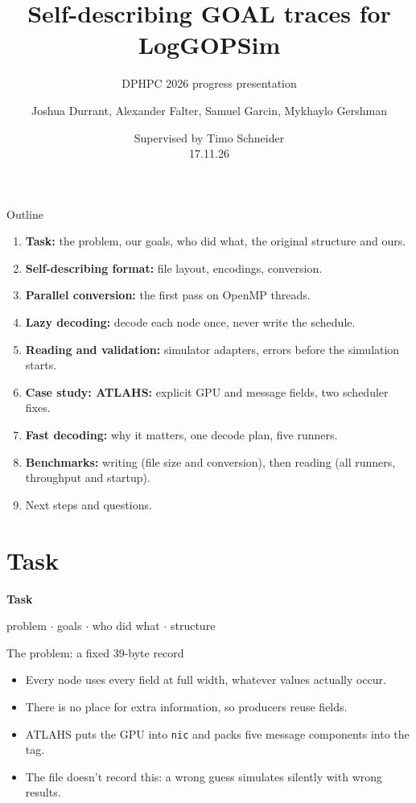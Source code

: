 \documentclass[aspectratio=169,11pt]{beamer}
\title{Self-describing GOAL traces for LogGOPSim}
\subtitle{DPHPC 2026 progress presentation}
\author{Joshua Durrant, Alexander Falter, Samuel Garcin, Mykhaylo Gershman}
\date{Supervised by Timo Schneider \\ 17.11.26}
\newcommand{\diagram}[1]{\resizebox{\linewidth}{!}{}}
\begin{document}
\begin{frame}
\titlepage
\end{frame}

\begin{frame}{Outline}
\begin{enumerate}
\item \textbf{Task:} the problem, our goals, who did what, the original structure and ours.
\item \textbf{Self-describing format:} file layout, encodings, conversion.
\item \textbf{Parallel conversion:} the first pass on OpenMP threads.
\item \textbf{Lazy decoding:} decode each node once, never write the schedule.
\item \textbf{Reading and validation:} simulator adapters, errors before the simulation starts.
\item \textbf{Case study: ATLAHS:} explicit GPU and message fields, two scheduler fixes.
\item \textbf{Fast decoding:} why it matters, one decode plan, five runners.
\item \textbf{Benchmarks:} writing (file size and conversion), then reading (all runners, throughput and startup).
\item Next steps and questions.
\end{enumerate}
\end{frame}

\section{Task}

\begin{frame}
\centering\vfill
{\Huge\bfseries Task\par}
\vspace{3mm}
{\small\color{black!60}problem $\cdot$ goals $\cdot$ who did what $\cdot$ structure\par}
\vfill
\end{frame}

\begin{frame}{The problem: a fixed 39-byte record}
\diagram{legacy-record}
\vspace{2mm}
\begin{itemize}
\item Every node uses every field at full width, whatever values actually occur.
\item There is no place for extra information, so producers reuse fields.
\item ATLAHS puts the GPU into \texttt{nic} and packs five message components into the tag.
\item The file doesn't record this: a wrong guess simulates silently with wrong results.
\end{itemize}
\end{frame}
\end{document}
